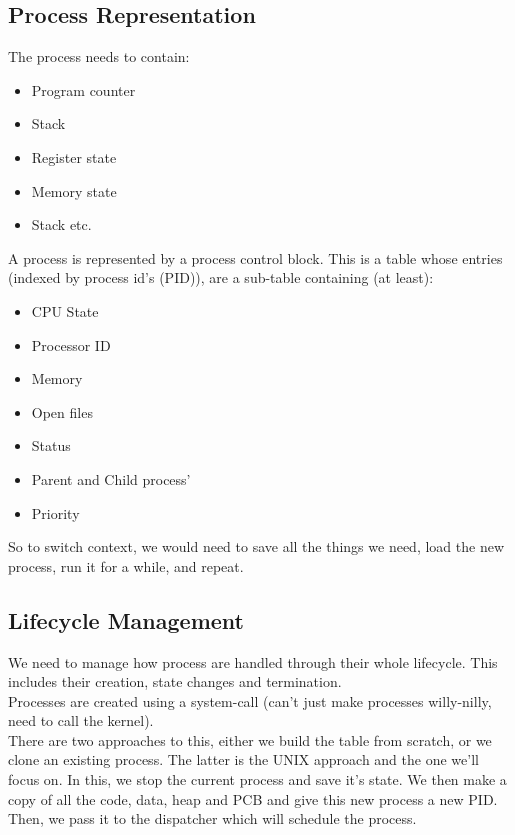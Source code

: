 \documentclass[12pt]{article}
\theoremstyle{definition}
\begin{document}
\subsection{Process Representation}
The process needs to contain:
\begin{itemize}
	\item Program counter
	\item Stack
	\item Register state
	\item Memory state
	\item Stack etc.
\end{itemize}
A process is represented by a process control block. This is a table whose entries (indexed by process id's (PID)), are a sub-table containing (at least):
\begin{itemize}
	\item CPU State
	\item Processor ID
	\item Memory
	\item Open files
	\item Status
	\item Parent and Child process'
	\item Priority
\end{itemize}
So to switch context, we would need to save all the things we need, load the new process, run it for a while, and repeat.

\subsection{Lifecycle Management}
We need to manage how process are handled through their whole lifecycle. This includes their creation, state changes and termination.
\\ \linebreak
Processes are created using a system-call (can't just make processes willy-nilly, need to call the kernel).
\\ \linebreak
There are two approaches to this, either we build the table from scratch, or we clone an existing process. The latter is the UNIX approach and the one we'll focus on. In this, we stop the current process and save it's state. We then make a copy of all the code, data, heap and PCB and give this new process a new PID. Then, we pass it to the dispatcher which will schedule the process.
\\ \linebreak
\end{document}
